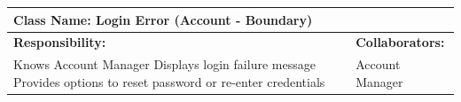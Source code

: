 \documentclass[]{article}
\begin{document}
	\begin{table}[H]
	    \centering
	    \begin{tabular}{|p{7cm}|p{7cm}|}
	    \hline 
	     \multicolumn{2}{|l|}{\textbf{Class Name: Login Error (Account - Boundary)}} \\
	    \hline
	    \textbf{Responsibility:} & \textbf{Collaborators:} \\
	    \hline
	    Knows Account Manager \newline
	    Displays login failure message \newline
	    Provides options to reset password or re-enter credentials & 		
	    Account Manager \\
	    \hline
	    \end{tabular}
	\end{table}
	
\end{document}
